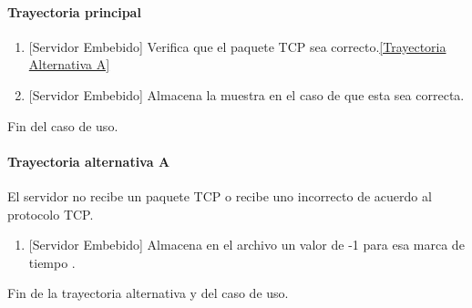 \paragraph{Trayectoria principal}
    \label{SUB-M-CU1.5:TP}
	\begin{enumerate}
	    \item {[Servidor Embebido]} Verifica que el paquete TCP sea correcto.\hyperref[SUB-M-CU1.5:TA]{[Trayectoria Alternativa A]}
	    \item {[Servidor Embebido]} Almacena la muestra en el caso de que esta sea correcta.
	\end{enumerate}
	Fin del caso de uso.
	
\paragraph{Trayectoria alternativa A} \label{SUB-M-CU1.5:TA}
	El servidor no recibe un paquete TCP o recibe uno incorrecto de acuerdo al protocolo TCP.
	\begin{enumerate}[label=A\arabic*.]
		\item {[Servidor Embebido]} Almacena en el archivo un valor de -1 para esa marca de tiempo .
	\end{enumerate}
	Fin de la trayectoria alternativa y del caso de uso.
